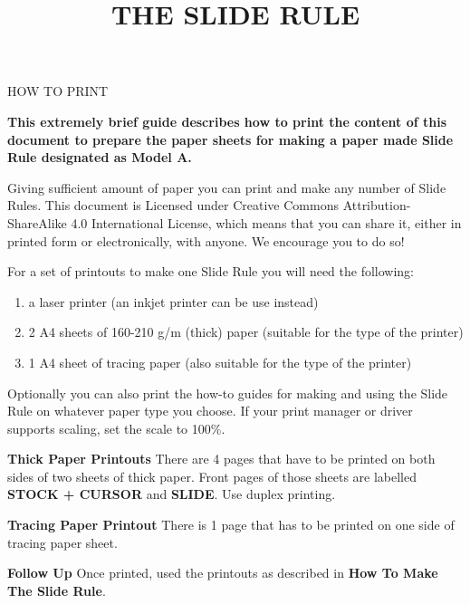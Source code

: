 
\newcommand{\makefulltitle}{How To Print The Slide Rule }



\title{\fontsize{60}{60}\selectfont THE SLIDE RULE}
\preauthor{}\postauthor{}\author{}
\predate{}\postdate{}\date{}


  \begin{center}
    \headingfont\fontsize{20}{20}\selectfont HOW TO PRINT
  \end{center}

  {\let\newpage\relax\maketitle}%
  \nosection{}
  \large\textbf{\makeperex This extremely brief guide describes how to print the content of this document to prepare the paper sheets for making a paper made Slide Rule designated as Model A.}

  \begin{multicols*}{3}
  \normalsize{

  Giving sufficient amount of paper you can print and make any number of Slide Rules. This document is Licensed under Creative Commons Attribution-ShareAlike 4.0 International License, which means that you can share it, either in printed form or electronically, with anyone. We encourage you to do so!

  For a set of printouts to make one Slide Rule you will need the following:
    \begin{enumerate}
      \setlength{\parskip}{0pt}
      \setlength{\parsep}{0pt}
      \item a laser printer (an inkjet printer can be use instead)
      \item 2 A4 sheets of 160-210 g/m (thick) paper (suitable for the type of the printer)
      \item 1 A4 sheet of tracing paper (also suitable for the type of the printer)
    \end{enumerate}

  Optionally you can also print the how-to guides for making and using the Slide Rule on whatever paper type you choose. If your print manager or driver supports scaling, set the scale to 100\%.

  \textbf{Thick Paper Printouts}
There are 4 pages that have to be printed on both sides of two sheets of thick paper. Front pages of those sheets are labelled \textbf{STOCK + CURSOR} and \textbf{SLIDE}. Use duplex printing.

  \textbf{Tracing Paper Printout}
There is 1 page that has to be printed on one side of tracing paper sheet. 

  \textbf{Follow Up}
Once printed, used the printouts as described in \textbf{How To Make The Slide Rule}.

  }
  \end{multicols*}
  

